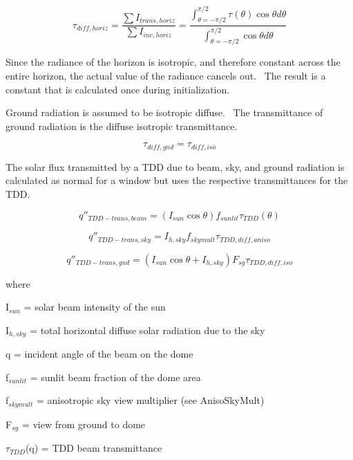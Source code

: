 \begin{equation}
{\tau_{diff,horiz}} = \frac{{\sum {{I_{trans,horiz}}} }}{{\sum {{I_{inc,horiz}}} }} = \frac{{\int_{\theta  =  - \pi /2}^{\pi /2} {\tau (\theta )\cos \theta d\theta } }}{{\int_{\theta  =  - \pi /2}^{\pi /2} {\cos \theta d\theta } }}
\end{equation}

Since the radiance of the horizon is isotropic, and therefore constant across the entire horizon, the actual value of the radiance cancels out.~ The result is a constant that is calculated once during initialization.

Ground radiation is assumed to be isotropic diffuse.~ The transmittance of ground radiation is the diffuse isotropic transmittance.

\begin{equation}
{\tau_{diff,gnd}} = {\tau_{diff,iso}}
\end{equation}

The solar flux transmitted by a TDD due to beam, sky, and ground radiation is calculated as normal for a window but uses the respective transmittances for the TDD.

\begin{equation}
{q''_{TDD - trans,beam}} = \left( {{I_{sun}}\cos \theta } \right){f_{sunlit}}{\tau_{TDD}}(\theta )
\end{equation}

\begin{equation}
{q''_{TDD - trans,sky}} = {I_{h,sky}}{f_{skymult}}{\tau_{TDD,diff,aniso}}
\end{equation}

\begin{equation}
{q''_{TDD - trans,gnd}} = \left( {{I_{sun}}\cos \theta  + {I_{h,sky}}} \right){F_{sg}}{\tau_{TDD,diff,iso}}
\end{equation}

where

I\(_{sun}\) = solar beam intensity of the sun

I\(_{h,sky}\) = total horizontal diffuse solar radiation due to the sky

q = incident angle of the beam on the dome

f\(_{sunlit}\) = sunlit beam fraction of the dome area

f\(_{skymult}\) = anisotropic sky view multiplier (see AnisoSkyMult)

F\(_{sg}\) = view from ground to dome

\(\tau_{TDD}\)(q) = TDD beam transmittance

